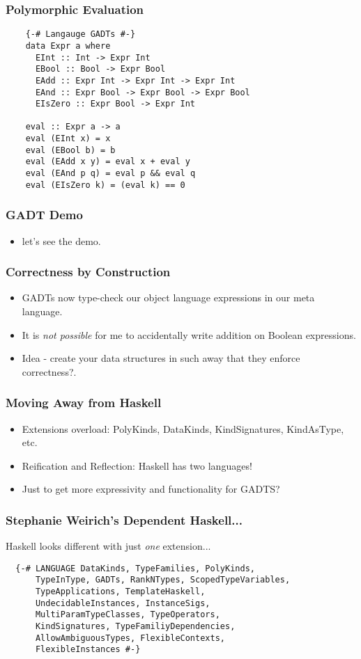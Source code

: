 \documentclass[hyperref={colorlinks = true,linkcolor = blue, citecolor = blue, urlcolor = blue}]{beamer}
\begin{document}
\begin{frame}[fragile]
\frametitle{Polymorphic Evaluation}
  \begin{verbatim}
    {-# Langauge GADTs #-}
    data Expr a where
      EInt :: Int -> Expr Int
      EBool :: Bool -> Expr Bool
      EAdd :: Expr Int -> Expr Int -> Expr Int
      EAnd :: Expr Bool -> Expr Bool -> Expr Bool
      EIsZero :: Expr Bool -> Expr Int

    eval :: Expr a -> a
    eval (EInt x) = x
    eval (EBool b) = b
    eval (EAdd x y) = eval x + eval y
    eval (EAnd p q) = eval p && eval q
    eval (EIsZero k) = (eval k) == 0
  \end{verbatim}
\end{frame}

\begin{frame}[fragile]
\frametitle{GADT Demo}
  \begin{itemize}
    \item let's see the demo.
  \end{itemize}
\end{frame}

\begin{frame}[fragile]
\frametitle{Correctness by Construction}
\begin{itemize}
  \item GADTs now type-check our object language expressions in our meta language.
  \item It is \emph{not possible} for me to accidentally write addition on Boolean expressions.
  \item Idea - create your data structures in such away that they enforce correctness?.
\end{itemize}
\end{frame}

\begin{frame}[fragile]
  \frametitle{Moving Away from Haskell}
  \begin{itemize}
    \item Extensions overload: PolyKinds, DataKinds, KindSignatures, KindAsType, etc.
    \item Reification and Reflection: Haskell has two languages!
    \item Just to get more expressivity and functionality for GADTS?
  \end{itemize}
\end{frame}

\begin{frame}[fragile]
  \frametitle{Stephanie Weirich's Dependent Haskell...}
  Haskell looks different with just \emph{one} extension...
  \begin{verbatim}
  {-# LANGUAGE DataKinds, TypeFamilies, PolyKinds, 
      TypeInType, GADTs, RankNTypes, ScopedTypeVariables,
      TypeApplications, TemplateHaskell, 
      UndecidableInstances, InstanceSigs, 
      MultiParamTypeClasses, TypeOperators, 
      KindSignatures, TypeFamiliyDependencies, 
      AllowAmbiguousTypes, FlexibleContexts, 
      FlexibleInstances #-}
  \end{verbatim}
\end{frame}
\end{document}
